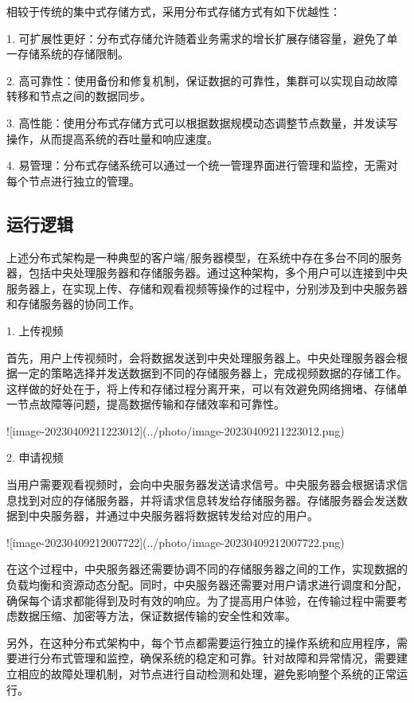 相较于传统的集中式存储方式，采用分布式存储方式有如下优越性：

1. 可扩展性更好：分布式存储允许随着业务需求的增长扩展存储容量，避免了单一存储系统的存储限制。

2. 高可靠性：使用备份和修复机制，保证数据的可靠性，集群可以实现自动故障转移和节点之间的数据同步。

3. 高性能：使用分布式存储方式可以根据数据规模动态调整节点数量，并发读写操作，从而提高系统的吞吐量和响应速度。

4. 易管理：分布式存储系统可以通过一个统一管理界面进行管理和监控，无需对每个节点进行独立的管理。

\subsection{运行逻辑}

上述分布式架构是一种典型的客户端/服务器模型，在系统中存在多台不同的服务器，包括中央处理服务器和存储服务器。通过这种架构，多个用户可以连接到中央服务器上，在实现上传、存储和观看视频等操作的过程中，分别涉及到中央服务器和存储服务器的协同工作。

1. 上传视频

首先，用户上传视频时，会将数据发送到中央处理服务器上。中央处理服务器会根据一定的策略选择并发送数据到不同的存储服务器上，完成视频数据的存储工作。这样做的好处在于，将上传和存储过程分离开来，可以有效避免网络拥堵、存储单一节点故障等问题，提高数据传输和存储效率和可靠性。

![image-20230409211223012](../photo/image-20230409211223012.png)

2. 申请视频

当用户需要观看视频时，会向中央服务器发送请求信号。中央服务器会根据请求信息找到对应的存储服务器，并将请求信息转发给存储服务器。存储服务器会发送数据到中央服务器，并通过中央服务器将数据转发给对应的用户。

![image-20230409212007722](../photo/image-20230409212007722.png)

在这个过程中，中央服务器还需要协调不同的存储服务器之间的工作，实现数据的负载均衡和资源动态分配。同时，中央服务器还需要对用户请求进行调度和分配，确保每个请求都能得到及时有效的响应。为了提高用户体验，在传输过程中需要考虑数据压缩、加密等方法，保证数据传输的安全性和效率。

另外，在这种分布式架构中，每个节点都需要运行独立的操作系统和应用程序，需要进行分布式管理和监控，确保系统的稳定和可靠。针对故障和异常情况，需要建立相应的故障处理机制，对节点进行自动检测和处理，避免影响整个系统的正常运行。


